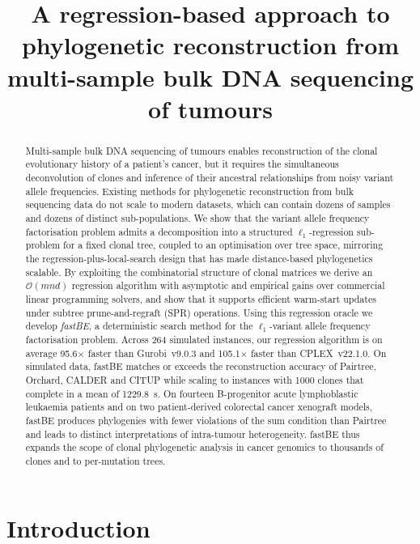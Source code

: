 \documentclass[11pt]{article}
\title{A regression-based approach to phylogenetic reconstruction from multi-sample bulk DNA sequencing of tumours}
\author{}
\date{}
\begin{document}
\maketitle

\begin{abstract}
Multi-sample bulk DNA sequencing of tumours enables reconstruction of the clonal evolutionary history of a patient's cancer, but it requires the simultaneous deconvolution of clones and inference of their ancestral relationships from noisy variant allele frequencies. Existing methods for phylogenetic reconstruction from bulk sequencing data do not scale to modern datasets, which can contain dozens of samples and dozens of distinct sub-populations. We show that the variant allele frequency factorisation problem admits a decomposition into a structured $\ell_1$-regression sub-problem for a fixed clonal tree, coupled to an optimisation over tree space, mirroring the regression-plus-local-search design that has made distance-based phylogenetics scalable. By exploiting the combinatorial structure of clonal matrices we derive an $\mathcal{O}(mnd)$ regression algorithm with asymptotic and empirical gains over commercial linear programming solvers, and show that it supports efficient warm-start updates under subtree prune-and-regraft (SPR) operations. Using this regression oracle we develop \emph{fastBE}, a deterministic search method for the $\ell_1$-variant allele frequency factorisation problem. Across 264 simulated instances, our regression algorithm is on average 95.6$\times$ faster than Gurobi~v9.0.3 and 105.1$\times$ faster than CPLEX~v22.1.0. On simulated data, fastBE matches or exceeds the reconstruction accuracy of Pairtree, Orchard, CALDER and CITUP while scaling to instances with 1000 clones that complete in a mean of 1229.8~s. On fourteen B-progenitor acute lymphoblastic leukaemia patients and on two patient-derived colorectal cancer xenograft models, fastBE produces phylogenies with fewer violations of the sum condition than Pairtree and leads to distinct interpretations of intra-tumour heterogeneity. fastBE thus expands the scope of clonal phylogenetic analysis in cancer genomics to thousands of clones and to per-mutation trees.
\end{abstract}

\section{Introduction}
\end{document}
